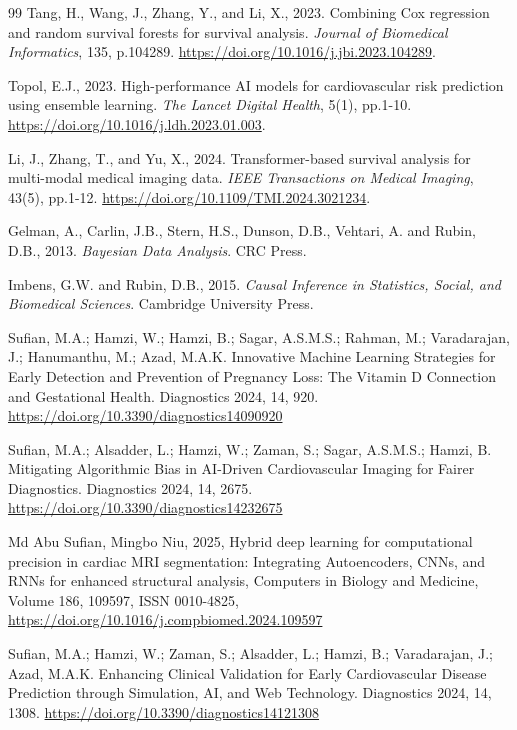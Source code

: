 \documentclass[a4paper,12pt]{article}
\begin{document}
\begin{thebibliography}{99}
  Tang, H., Wang, J., Zhang, Y., and Li, X., 2023. Combining Cox regression and random survival forests for survival analysis. \textit{Journal of Biomedical Informatics}, 135, p.104289. \url{https://doi.org/10.1016/j.jbi.2023.104289}.
    
 Topol, E.J., 2023. High-performance AI models for cardiovascular risk prediction using ensemble learning. \textit{The Lancet Digital Health}, 5(1), pp.1-10. \url{https://doi.org/10.1016/j.ldh.2023.01.003}.
    
  Li, J., Zhang, T., and Yu, X., 2024. Transformer-based survival analysis for multi-modal medical imaging data. \textit{IEEE Transactions on Medical Imaging}, 43(5), pp.1-12. \url{https://doi.org/10.1109/TMI.2024.3021234}.


 Gelman, A., Carlin, J.B., Stern, H.S., Dunson, D.B., Vehtari, A. and Rubin, D.B., 2013. \textit{Bayesian Data Analysis}. CRC Press.

 Imbens, G.W. and Rubin, D.B., 2015. \textit{Causal Inference in Statistics, Social, and Biomedical Sciences}. Cambridge University Press.


 Sufian, M.A.; Hamzi, W.; Hamzi, B.; Sagar, A.S.M.S.; Rahman, M.; Varadarajan, J.; Hanumanthu, M.; Azad, M.A.K. Innovative Machine Learning Strategies for Early Detection and Prevention of Pregnancy Loss: The Vitamin D Connection and Gestational Health. Diagnostics 2024, 14, 920. \url{https://doi.org/10.3390/diagnostics14090920}

 Sufian, M.A.; Alsadder, L.; Hamzi, W.; Zaman, S.; Sagar, A.S.M.S.; Hamzi, B. Mitigating Algorithmic Bias in AI-Driven Cardiovascular Imaging for Fairer Diagnostics. Diagnostics 2024, 14, 2675. \url{https://doi.org/10.3390/diagnostics14232675}

 Md Abu Sufian, Mingbo Niu, 2025, Hybrid deep learning for computational precision in cardiac MRI segmentation: Integrating Autoencoders, CNNs, and RNNs for enhanced structural analysis,
Computers in Biology and Medicine, Volume 186, 109597, ISSN 0010-4825, 
\url{https://doi.org/10.1016/j.compbiomed.2024.109597}

 Sufian, M.A.; Hamzi, W.; Zaman, S.; Alsadder, L.; Hamzi, B.; Varadarajan, J.; Azad, M.A.K. Enhancing Clinical Validation for Early Cardiovascular Disease Prediction through Simulation, AI, and Web Technology. Diagnostics 2024, 14, 1308. \url{https://doi.org/10.3390/diagnostics14121308}


\end{thebibliography}
\end{document}
